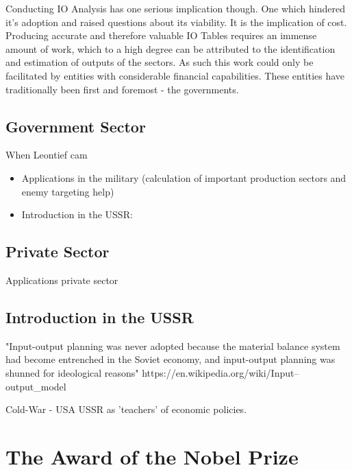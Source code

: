\documentclass[12pt,a4paper]{scrartcl}
\begin{document}

	Conducting IO Analysis has one serious implication though. One which hindered it's adoption and raised questions about its viability. It is the implication of cost. Producing accurate and therefore valuable IO Tables requires an immense amount of work, which to a high degree can be attributed to the identification and estimation of outputs of the sectors. As such this work could only be facilitated by entities with considerable financial capabilities. These entities have traditionally been first and foremost - the governments.

	\subsection{Government Sector}
	
	When Leontief cam
	
	\begin{itemize}
		\item Applications in the military (calculation of important production sectors and enemy targeting help)
		\item Introduction in the USSR: \cite{leontief1960niedergang}
	\end{itemize}
	
	\subsection{Private Sector}
	
	Applications private sector 
	
	\subsection{Introduction in the USSR} \label{ussr}
	"Input-output planning was never adopted because the material balance system had become entrenched in the Soviet economy, and input-output planning was shunned for ideological reasons" 
	 https://en.wikipedia.org/wiki/Input–output\_model
	
	Cold-War - USA USSR as 'teachers' of economic policies.\newline
	
	\section{The Award of the Nobel Prize} \label{nobelprize}
	
\end{document}
